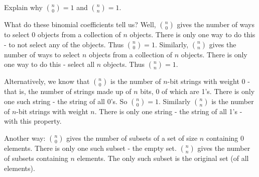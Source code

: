 \documentclass[12pt]{article}
\begin{document}
\begin{example}
  Explain why ${n \choose 0} = 1$ and ${n \choose n} = 1$.
  \begin{solution}
    What do these binomial coefficients tell us? Well, ${n \choose 0}$ gives the number of ways to select 0 objects from a collection of $n$ objects.  There is only one way to do this - to not select any of the objects.  Thus ${n \choose 0} = 1$.  Similarly, ${n \choose n}$ gives the number of ways to select $n$ objects from a collection of $n$ objects.  There is only one way to do this - select all $n$ objects.  Thus ${n \choose n} = 1$.
    
    Alternatively, we know that ${n \choose 0}$ is the number of $n$-bit strings with weight 0 - that is, the number of strings made up of $n$ bits, 0 of which are 1's.  There is only one such string - the string of all 0's.  So ${n \choose 0} = 1$.  Similarly ${n \choose n}$ is the number of $n$-bit strings with weight $n$.  There is only one string - the string of all 1's - with this property.
    
    Another way: ${n \choose 0}$ gives the number of subsets of a set of size $n$ containing 0 elements.  There is only one such subset - the empty set.  ${n \choose n}$ gives the number of subsets containing $n$ elements.  The only such subset is the original set (of all elements).
  \end{solution}

\end{example}
\end{document}
